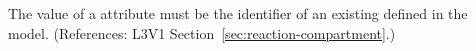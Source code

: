 The value of a \Reaction {} attribute must be the
identifier of an existing \Compartment defined in the model.  (References:
L3V1 Section~\ref{sec:reaction-compartment}.)
